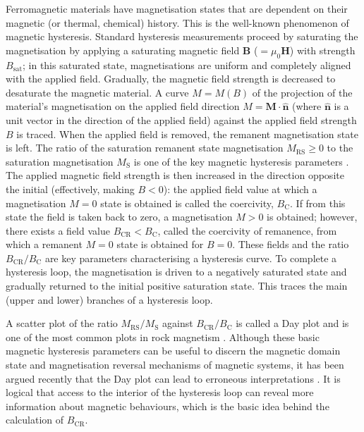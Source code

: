 Ferromagnetic materials have magnetisation states that are dependent on their magnetic (or thermal, chemical) history. This is the well-known phenomenon of magnetic hysteresis. Standard hysteresis measurements proceed by saturating the magnetisation by applying a saturating magnetic field $\boldsymbol{B}$ ($=\mu_0\boldsymbol{H}$) with strength $B_{\text{sat}}$; in this saturated state, magnetisations are uniform and completely aligned with the applied field. Gradually, the magnetic field strength is decreased to desaturate the magnetic material. A curve $M=M(B)$ of the projection of the material's magnetisation on the applied field direction $M=\boldsymbol{M}\cdot\boldsymbol{\hat{n}}$ (where $\boldsymbol{\hat{n}}$ is a unit vector in the direction of the applied field) against the applied field strength $B$ is traced. When the applied field is removed, the remanent magnetisation state is left. The ratio of the saturation remanent state magnetisation $M_{\text{RS}} \geq 0$ to the saturation magnetisation $M_{\text{S}}$ is one of the key magnetic hysteresis parameters \citep{Dunlop}. The applied magnetic field strength is then increased in the direction opposite the initial (effectively, making $B<0$): the applied field value at which a magnetisation $M=0$ state is obtained is called the coercivity, $B_\text{C}$. If from this state the field is taken back to zero, a magnetisation $M>0$ is obtained; however, there exists a field value $B_{\text{CR}}<B_{\text{C}}$, called the coercivity of remanence, from which a remanent $M=0$ state is obtained for $B=0$. These fields and the ratio $B_{\text{CR}}/B_{\text{C}}$ are key parameters characterising a hysteresis curve. To complete a hysteresis loop, the magnetisation is driven to a negatively saturated state and gradually returned to the initial positive saturation state. This traces the main (upper and lower) branches of a hysteresis loop.\par

A scatter plot of the ratio $M_{\text{RS}}/M_{\text{S}}$ against $B_{\text{CR}}/B_{\text{C}}$ is called a Day plot \citep{Day1977} and is one of the most common plots in rock magnetism \citep{Dunlop}. Although these basic magnetic hysteresis parameters can be useful to discern the magnetic domain state and magnetisation reversal mechanisms of magnetic systems, it has been argued recently that the Day plot can lead to erroneous interpretations \citep{Egli2014,Roberts2017}. It is logical that access to the interior of the hysteresis loop can reveal more information about magnetic behaviours, which is the basic idea behind the calculation of $B_{\text{CR}}$.\par

